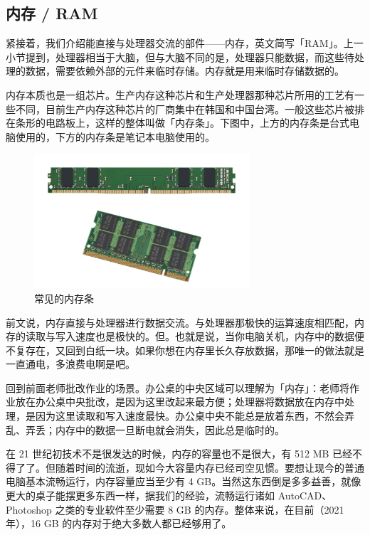 \subsection{内存 / RAM}

紧接着，我们介绍能直接与处理器交流的部件——内存，英文简写「RAM」。上一小节提到，处理器相当于大脑，但与大脑不同的是，处理器只能数据，而这些待处理的数据，需要依赖外部的元件来临时存储。内存就是用来临时存储数据的。

内存本质也是一组芯片。生产内存这种芯片和生产处理器那种芯片所用的工艺有一些不同，目前生产内存这种芯片的厂商集中在韩国和中国台湾。一般这些芯片被排在条形的电路板上，这样的整体叫做「内存条」。下图中，上方的内存条是台式电脑使用的，下方的内存条是笔记本电脑使用的。

\begin{figure}[H]
  \centering
  \includegraphics[width=8cm]{assets/RAMs.jpg}
  \caption{常见的内存条}
  \label{rams}
\end{figure}

前文说，内存直接与处理器进行数据交流。与处理器那极快的运算速度相匹配，内存的读取与写入速度也是极快的。但。也就是说，当你电脑关机，内存中的数据便不复存在，又回到白纸一块。如果你想在内存里长久存放数据，那唯一的做法就是一直通电，多浪费电啊是吧。

回到前面老师批改作业的场景。办公桌的中央区域可以理解为「内存」：老师将作业放在办公桌中央批改，是因为这里改起来最方便；处理器将数据放在内存中处理，是因为这里读取和写入速度最快。办公桌中央不能总是放着东西，不然会弄乱、弄丢；内存中的数据一旦断电就会消失，因此总是临时的。

在 21 世纪初技术不是很发达的时候，内存的容量也不是很大，有 512 MB 已经不得了了。但随着时间的流逝，现如今大容量内存已经司空见惯。要想让现今的普通电脑基本流畅运行，内存容量应当至少有 4 GB。当然这东西倒是多多益善，就像更大的桌子能摆更多东西一样，据我们的经验，流畅运行诸如 AutoCAD、Photoshop 之类的专业软件至少需要 8 GB 的内存。整体来说，在目前（2021 年），16 GB 的内存对于绝大多数人都已经够用了。

